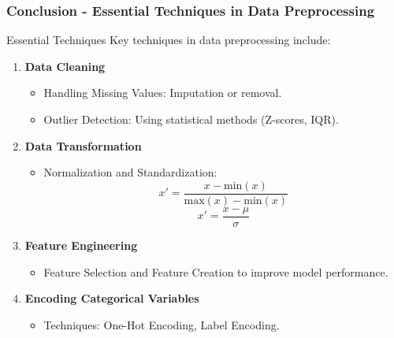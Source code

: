 \documentclass[aspectratio=169]{beamer}
\begin{document}
\begin{frame}[fragile]
    \frametitle{Conclusion - Essential Techniques in Data Preprocessing}
    \begin{block}{Essential Techniques}
        Key techniques in data preprocessing include:
    \end{block}
    \begin{enumerate}
        \item \textbf{Data Cleaning}
            \begin{itemize}
                \item Handling Missing Values: Imputation or removal.
                \item Outlier Detection: Using statistical methods (Z-scores, IQR).
            \end{itemize}
        
        \item \textbf{Data Transformation}
            \begin{itemize}
                \item Normalization and Standardization:
                    \begin{equation}
                        x' = \frac{x - \text{min}(x)}{\text{max}(x) - \text{min}(x)}
                    \end{equation}
                    \begin{equation}
                        x' = \frac{x - \mu}{\sigma}
                    \end{equation}
            \end{itemize}
        
        \item \textbf{Feature Engineering}
            \begin{itemize}
                \item Feature Selection and Feature Creation to improve model performance.
            \end{itemize}
        
        \item \textbf{Encoding Categorical Variables}
            \begin{itemize}
                \item Techniques: One-Hot Encoding, Label Encoding.
            \end{itemize}
    \end{enumerate}
\end{frame}
\end{document}

